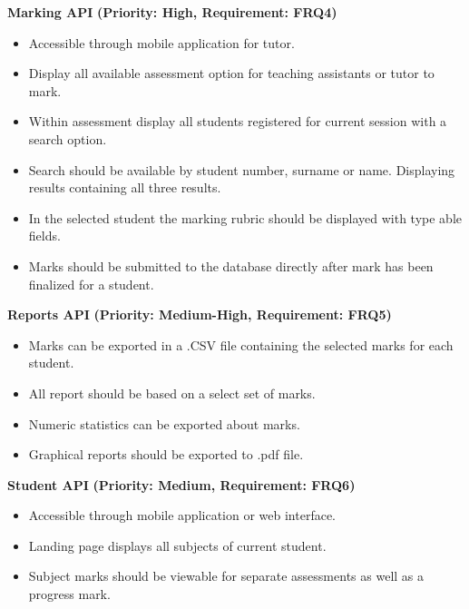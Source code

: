 \documentclass[12pt]{article}
\begin{document}
		\vspace{0.15in}
		
		\textbf{Marking API}
		\textbf{(Priority: High, Requirement: FRQ4)}
		\begin{itemize}
			\item Accessible through mobile application for tutor.
			\item Display all available assessment option for teaching assistants or tutor to mark.
			\item Within assessment display all students registered for current session with a search option.
			\item Search should be available by student number, surname or name. Displaying results containing all three results.
			\item In the selected student the marking rubric should be displayed with type able fields.
			\item Marks should be submitted to the database directly after mark has been finalized for a student.
		\end{itemize}
		
		\vspace{0.15in}
		
		\textbf{Reports API}
		\textbf{(Priority: Medium-High, Requirement: FRQ5)}
		\begin{itemize}
			\item Marks can be exported in a .CSV file containing the selected marks for each student.
			\item All report should be based on a select set of marks.
			\item Numeric statistics can be exported about marks.
			\item Graphical reports should be exported to .pdf file.
		\end{itemize}
		
		\vspace{0.2in}
		
		\textbf{Student API}
		\textbf{(Priority: Medium, Requirement: FRQ6)}
		\begin{itemize}
			\item Accessible through mobile application or web interface.
			\item Landing page displays all subjects of current student.
			\item Subject marks should be viewable for separate assessments as well as a progress mark.
		\end{itemize}
		
	\vspace{0.2in}
	
\end{document}
